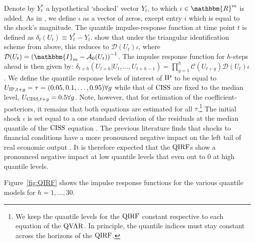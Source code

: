 Denote by $Y_t^{*}$ a hypothetical `shocked' vector $Y_t$, to which $\iota \in \mathbbm{R}^m$ is added. As in \citet{chavleishvili2024forecasting}, we define $\iota$ as a vector of zeros, except entry $i$ which is equal to the shock's magnitude. The quantile impulse-response function at time point $t$ is defined as $\delta_{t}(U_t) \equiv Y_t^{*} - Y_t$.  \citet{chavleishvili2024forecasting} show that under the triangular identification scheme from above, this reduces to $\mathcal{D}(U_t)\iota$, where $\mathcal{D}(U_t) = \left( \mathbbm{I}_m - \mathcal{A}_0(U_t) \right)^{-1}$. The impulse response function for $h$-steps ahead is then given by: $\delta_{t+h}\left( U_{t+h} \vert U_t,\dotsc, U_{t+h-1}\right) = \prod_{g=1}^h\mathcal{C}(U_{t+g})\mathcal{D}(U_t)\iota$. We define the quantile response levels of interest of $\operatorname{IP}$ to be equal to $U_{\operatorname{IP},t+g} = \tau = (0.05,0.1,\dotsc,0.95) \forall g$ while that of $\operatorname{CISS}$ are fixed to the median level, $U_{\operatorname{CISS},t+g} = 0.5 \forall g$. Note, however, that for estimation of the coefficient-posteriors, it remains that both equations are estimated for all $\tau$.\footnote{We keep the quantile levels for the $\operatorname{QIRF}$ constant respective to each equation of the $\operatorname{QVAR}$. In principle, the quantile indices must stay constant across the horizons of the $\operatorname{QIRF}$.} The initial shock $\iota$ is set equal to a one standard deviation of the residuals at the median quantile of the $\operatorname{CISS}$ equation \citep{chavleishvili2024forecasting}. The previous literature finds that shocks to financial conditions have a more pronounced negative impact on the left tail of real economic output \citep{adrian2019vulnerable,chavleishvili2024forecasting}. It is therefore expected that the $\operatorname{QIRF}$s show a pronounced negative impact at low quantile levels that even out to 0 at high quantile levels.
%

Figure~\ref{fig:QIRF} shows the impulse response functions for the various quantile models for $h=1,\dotsc,30$. %


